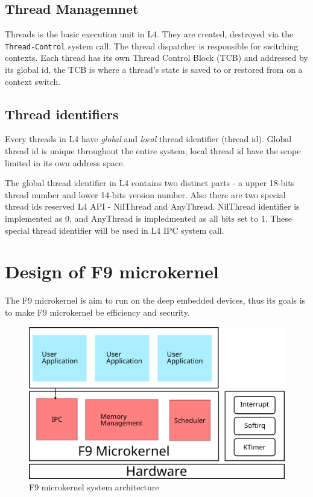 \documentclass[10pt,preprint,nocopyrightspace]{sigplanconf}
\begin{document}
\subsection{Thread Managemnet}

Threads is the basic execution unit in L4. They are created, destroyed via the \verb|Thread-Control| system call\cite{nourai2005aphysically}. The thread dispatcher is responsible for switching contexts. Each thread has its own Thread Control Block (TCB) and addressed by its global id, the TCB is where a thread's state is saved to or restored from on a context switch\cite{nourai2005aphysically}.

\subsection{Thread identifiers}

Every threads in L4 have \textit{global} and \textit{local} thread identifier (thread id). Global thread id is unique throughout the entire system, local thread id have the scope limited in its own address space.

The global thread identifier in L4 contains two distinct parts - a upper 18-bits thread number and lower 14-bits version number. Also there are two special thread ids reserved L4 API - NilThread and AnyThread. NilThread identifier is implemented as 0, and AnyThread is impledmented as all bits set to 1. These special thread identifier will be used in L4 IPC system call\cite{nourai2005aphysically}.

\section{Design of F9 microkernel}

The F9 microkernel is aim to run on the deep embedded devices, thus its goals is to make F9 microkernel be efficiency and security.

\begin{figure}[H]
	\begin{center}
		\includegraphics[width=\linewidth]{picture/f9_arch.png}
	\end{center}
	\caption{F9 microkernel system architecture}
	\label{fig:f9}
\end{figure}
\end{document}
